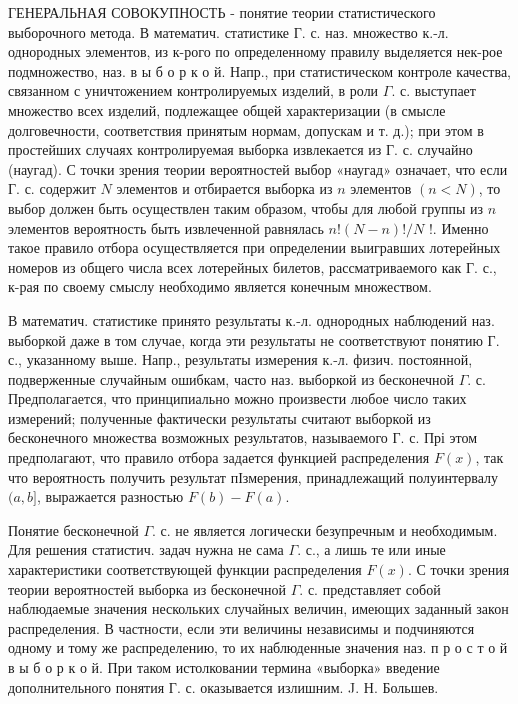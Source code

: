 \documentclass[10pt]{article}
\begin{document}
ГЕНЕРАЛЬНАЯ СОВОКУПНОСТЬ - понятие теории статистического выборочного метода. В математич. статистике Г. с. наз. множество к.-л. однородных элементов, из к-рого по определенному правилу выделяется нек-рое подмножество, наз. в ы б о р к о й. Напр., при статистическом контроле качества, связанном с уничтожением контролируемых изделий, в роли $\Gamma$. с. выступает множество всех изделий, подлежащее общей характеризации (в смысле долговечности, соответствия принятым нормам, допускам и т. д.); при этом в простейших случаях контролируемая выборка извлекается из Г. с. случайно (наугад). С точки зрения теории вероятностей выбор «наугад» означает, что если Г. с. содержит $N$ элементов и отбирается выборка из $n$ элементов $(n<N)$, то выбор должен быть осуществлен таким образом, чтобы для любой группы из $n$ элементов вероятность быть извлеченной равнялась $n !(N-n) ! / N$ !. Именно такое правило отбора осуществляется при определении выигравших лотерейных номеров из общего числа всех лотерейных билетов, рассматриваемого как Г. с., к-рая по своему смыслу необходимо является конечным множеством.



В математич. статистике принято результаты к.-л. однородных наблюдений наз. выборкой даже в том случае, когда эти результаты не соответствуют понятию Г. с., указанному выше. Напр., результаты измерения к.-л. физич. постоянной, подверженные случайным ошибкам, часто наз. выборкой из бесконечной $\Gamma$. с. Предполагается, что принципиально можно произвести любое число таких измерений; полученные фактически результаты считают выборкой из бесконечного множества возможных результатов, называемого Г. с. Прі этом предполагают, что правило отбора задается функцией распределения $F(x)$, так что вероятность получить результат пІзмерения, принадлежащий полуинтервалу $(a, b]$, выражается разностью $F(b)-F(a)$.



Понятие бесконечной $\Gamma$. с. не является логически безупречным и необходимым. Для решения статистич. задач нужна не сама $\Gamma$. с., а лишь те или иные характеристики соответствующей функции распределения $F(x)$. С точки зрения теории вероятностей выборка из бесконечной $\Gamma$. с. представляет собой наблюдаемые значения нескольких случайных величин, имеющих заданный закон распределения. В частности, если эти величины независимы и подчиняются одному и тому же распределению, то их наблюденные значения наз. п р о с т о й в ы б о р к о й. При таком истолковании термина «выборка» введение дополнительного понятия Г. с. оказывается излишним. J. Н. Большев.
\end{document}
